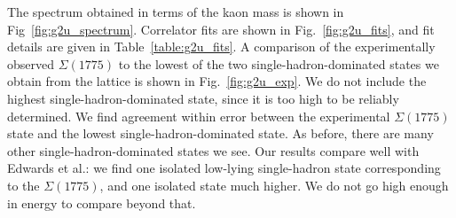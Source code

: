 The spectrum obtained in terms of the kaon mass is shown in Fig~\ref{fig:g2u_spectrum}. Correlator fits are shown in Fig.~\ref{fig:g2u_fits}, and fit details are given in Table~\ref{table:g2u_fits}. A comparison of the experimentally observed $\Sigma(1775)$ to the lowest of the two single-hadron-dominated states we obtain from the lattice is shown in Fig.~\ref{fig:g2u_exp}. We do not include the highest single-hadron-dominated state, since it is too high to be reliably determined. We find agreement within error between the experimental $\Sigma(1775)$ state and the lowest single-hadron-dominated state. As before, there are many other single-hadron-dominated states we see. Our results compare well with Edwards et al.: we find one isolated low-lying single-hadron state corresponding to the $\Sigma(1775)$, and one isolated state much higher. We do not go high enough in energy to compare beyond that.
\renewcommand{\arraystretch}{1.4}

